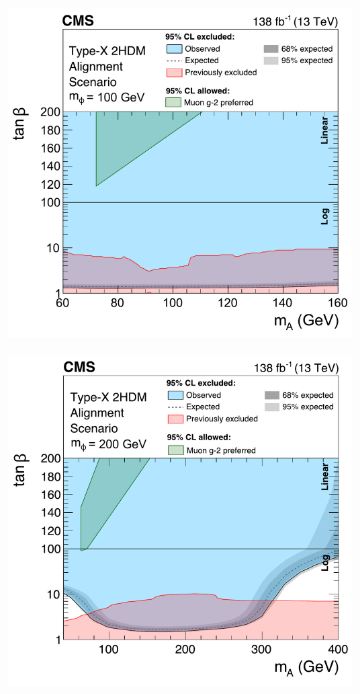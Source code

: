 \begin{figure}[!htbp]
        \centering
        \begin{subfigure}[b]{0.6\textwidth}
            \centering
            \includegraphics[width=\textwidth]{Figures/Chapter6/md_mphi100_hb_split_paper.pdf}
            \caption{}
        \end{subfigure}
        \begin{subfigure}[b]{0.6\textwidth}
            \centering
            \includegraphics[width=\textwidth]{Figures/Chapter6/md_mphi200_hb_gm2_v3_paper.pdf}
            \caption{}
        \end{subfigure}


\end{figure}
